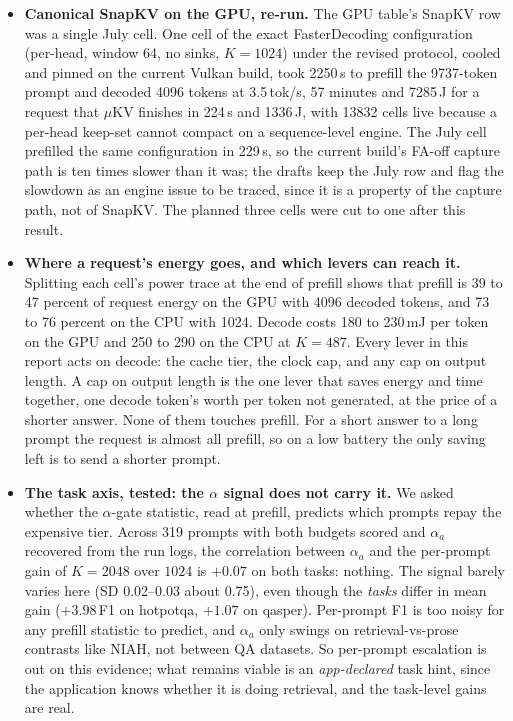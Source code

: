 \documentclass[11pt]{article}
\begin{document}
\begin{itemize}
\item \textbf{Canonical SnapKV on the GPU, re-run.} The GPU table's SnapKV row was a single July
cell. One cell of the exact FasterDecoding configuration (per-head, window 64, no sinks, $K{=}1024$)
under the revised protocol, cooled and pinned on the current Vulkan build, took 2250\,s to prefill the
9737-token prompt and decoded 4096 tokens at 3.5\,tok/s, 57 minutes and 7285\,J for a request that
$\mu$KV finishes in 224\,s and 1336\,J, with 13832 cells live because a per-head keep-set cannot
compact on a sequence-level engine. The July cell prefilled the same configuration in 229\,s, so the
current build's FA-off capture path is ten times slower than it was; the drafts keep the July row and
flag the slowdown as an engine issue to be traced, since it is a property of the capture path, not
of SnapKV. The planned three cells were cut to one after this result.

\item \textbf{Where a request's energy goes, and which levers can reach it.} Splitting each
cell's power trace at the end of prefill shows that prefill is 39 to 47 percent of request
energy on the GPU with 4096 decoded tokens, and 73 to 76 percent on the CPU with 1024. Decode
costs 180 to 230\,mJ per token on the GPU and 250 to 290 on the CPU at $K{=}487$. Every lever in
this report acts on decode: the cache tier, the clock cap, and any cap on output length. A cap
on output length is the one lever that saves energy and time together, one decode token's
worth per token not generated, at the price of a shorter answer. None of them touches prefill.
For a short answer to a long prompt the request is almost all prefill, so on a low battery the
only saving left is to send a shorter prompt.

\item \textbf{The task axis, tested: the $\alpha$ signal does not carry it.} We asked whether
the $\alpha$-gate statistic, read at prefill, predicts which prompts repay the expensive tier.
Across 319 prompts with both budgets scored and $\alpha_a$ recovered from the run logs, the
correlation between $\alpha_a$ and the per-prompt gain of $K{=}2048$ over $1024$ is $+0.07$ on
both tasks: nothing. The signal barely varies here (SD 0.02--0.03 about 0.75), even though the
\emph{tasks} differ in mean gain ($+3.98$\,F1 on hotpotqa, $+1.07$ on qasper). Per-prompt F1 is
too noisy for any prefill statistic to predict, and $\alpha_a$ only swings on
retrieval-vs-prose contrasts like NIAH, not between QA datasets. So per-prompt escalation is
out on this evidence; what remains viable is an \emph{app-declared} task hint, since the
application knows whether it is doing retrieval, and the task-level gains are real.


\end{itemize}
\end{document}
